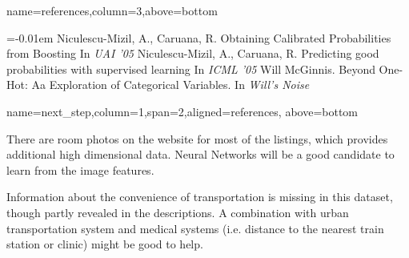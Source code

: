 \documentclass[landscape,final,a0paper,fontscale=0.285]{baposter}
\begin{document}
\begin{poster}
{\begin{multicols}{2}
  \end{multicols}
  \vspace{-0.6em}
}

  {name=references,column=3,above=bottom}{
    \smaller
    
    \renewcommand{\section}[2]{\vskip 0.05em}
      \begin{thebibliography}{1}\itemsep=-0.01em
      \setlength{\baselineskip}{0.4em}
        Niculescu-Mizil, A., Caruana, R.
        \newblock Obtaining Calibrated Probabilities from Boosting
        \newblock In {\em UAI '05}
        Niculescu-Mizil, A., Caruana, R.
        \newblock Predicting good probabilities with supervised learning
        \newblock In {\em ICML '05}
        Will McGinnis.
        \newblock Beyond One-Hot: Aa Exploration of Categorical Variables.
        \newblock In {\em Will's Noise}
      \end{thebibliography}
   \vspace{0.3em}
}

  {name=next_step,column=1,span=2,aligned=references, above=bottom}{
  \begin{multicols}{2}
    There are room photos on the website for most of the listings, which provides additional high dimensional data. Neural Networks will be a good candidate to learn from the image features.
    
    Information about the convenience of transportation is missing in this dataset, though partly revealed in the descriptions. A combination with urban transportation system and medical systems (i.e. distance to the nearest train station or clinic) might be good to help. 
    
  \end{multicols}
   \vspace{0.3em}
  }
\end{poster}
\end{document}
